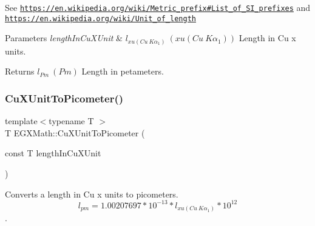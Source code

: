 See \href{https://en.wikipedia.org/wiki/Metric_prefix#List_of_SI_prefixes}{\tt https\+://en.\+wikipedia.\+org/wiki/\+Metric\+\_\+prefix\#\+List\+\_\+of\+\_\+\+S\+I\+\_\+prefixes} and \href{https://en.wikipedia.org/wiki/Unit_of_length}{\tt https\+://en.\+wikipedia.\+org/wiki/\+Unit\+\_\+of\+\_\+length} 
\begin{DoxyParams}{Parameters}
{\em length\+In\+Cu\+X\+Unit} & $ l_{xu(Cu\ K\alpha_1)}\ (xu(Cu\ K\alpha_1))$ Length in Cu x units. \\
\hline
\end{DoxyParams}
\begin{DoxyReturn}{Returns}
$ l_{Pm}\ (Pm)$ Length in petameters. 
\end{DoxyReturn}
\mbox{\label{group___e_g_x_math-_conversions-_length_conversions-_non-_s_i-_cu_x_unit-_s_i_ga789ff4191ad452d5dc54f4bd3d267566}} 
\subsubsection{\texorpdfstring{Cu\+X\+Unit\+To\+Picometer()}{CuXUnitToPicometer()}}
{\footnotesize\ttfamily template$<$typename T $>$ \\
T E\+G\+X\+Math\+::\+Cu\+X\+Unit\+To\+Picometer (\begin{DoxyParamCaption}\item[{const T}]{length\+In\+Cu\+X\+Unit }\end{DoxyParamCaption})}



Converts a length in Cu x units to picometers. \[ l_{pm}=1.00207697*10^{-13} * l_{xu(Cu\ K\alpha_1)} * 10^{12} \]. 

